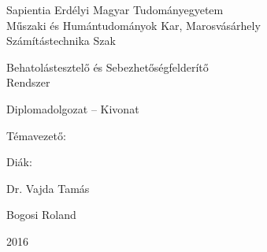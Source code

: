 
\renewcommand{\listoflistingscaption}{Kódrészletek jegyzéke}
\renewcommand{\listingscaption}{Kódrészlet}

\newpage
\pagestyle{empty}

	\begin{center}
		{\Large Sapientia Erdélyi Magyar Tudományegyetem}\\\vspace{0.07in}
		{\Large Műszaki és Humántudományok Kar, Marosvásárhely}\\\vspace{0.07in}
		{\Large Számítástechnika Szak}\\
		
		\vspace{2.35in}
		
		{\huge Behatolástesztelő és Sebezhetőségfelderítő}\\\vspace{0.15in}
		{\huge Rendszer}
		
		\vspace{0.5in}
		
		{\LARGE Diplomadolgozat -- Kivonat}
		
	\end{center}
	
	\vspace{2.0in}
	
	\begin{multicols}{2}
		\begin{flushleft}
			{\Large Témavezető:}
		\end{flushleft}
		\columnbreak
		\begin{flushright}
			{\Large Diák:}
		\end{flushright}
	\end{multicols}
	\begin{multicols}{2}
		\begin{flushleft}
			{\LARGE Dr. Vajda Tamás}
		\end{flushleft}
		\columnbreak
		\begin{flushright}
			{\LARGE Bogosi Roland}
		\end{flushright}
	\end{multicols}
	
	\vspace{1.5in}
		
	\begin{center}
		{\LARGE 2016}
	\end{center}

